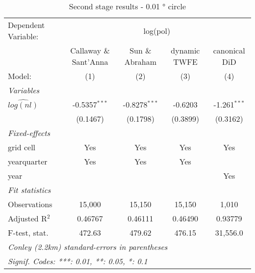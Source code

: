 
\begin{table}[ht]
   \caption{\label{tab:estimates0.01} Second stage results - 0.01 ° circle}
   \centering
   \begin{adjustbox}{width = \textwidth, center}
      \begin{tabular}{lcccc}
         \tabularnewline \midrule \midrule
         Dependent Variable: & \multicolumn{4}{c}{log(pol)}\\
          & Callaway \& Sant'Anna & Sun \& Abraham & dynamic TWFE & canonical DiD \\ 
         Model:               & (1)             & (2)             & (3)      & (4)\\  
         \midrule
         \emph{Variables}\\
         $\widehat{log(nl)}$  & -0.5357$^{***}$ & -0.8278$^{***}$ & -0.6203  & -1.261$^{***}$\\   
                              & (0.1467)        & (0.1798)        & (0.3899) & (0.3162)\\   
         \midrule
         \emph{Fixed-effects}\\
         grid cell            & Yes             & Yes             & Yes      & Yes\\  
         yearquarter          & Yes             & Yes             & Yes      & \\  
         year                 &                 &                 &          & Yes\\  
         \midrule
         \emph{Fit statistics}\\
         Observations         & 15,000          & 15,150          & 15,150   & 1,010\\  
         Adjusted R$^2$       & 0.46767         & 0.46111         & 0.46490  & 0.93779\\  
         F-test, stat.        & 472.63          & 479.62          & 476.15   & 31,556.0\\  
         \midrule \midrule
         \multicolumn{5}{l}{\emph{Conley (2.2km) standard-errors in parentheses}}\\
         \multicolumn{5}{l}{\emph{Signif. Codes: ***: 0.01, **: 0.05, *: 0.1}}\\
      \end{tabular}
   \end{adjustbox}
\end{table}



